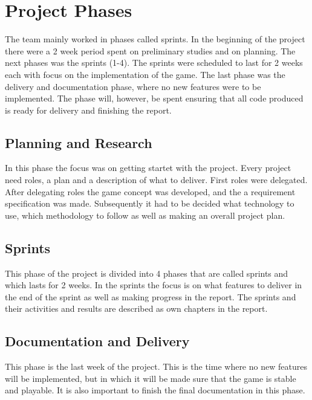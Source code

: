 \clearpage
\section{Project Phases}

The team mainly worked in phases called sprints. In the beginning of the project there were a 2 week period spent on preliminary studies and on planning. The next phases was the sprints (1-4). The sprints were scheduled to last for 2 weeks each with focus on the implementation of the game. The last phase was the delivery and documentation phase, where no new features were to be implemented. The phase will, however, be spent ensuring that all code produced is ready for delivery and finishing the report.

\subsection{Planning and Research}
In this phase the focus was on getting startet with the project. Every project need roles, a plan and a description of what to deliver. First roles were delegated. After delegating roles the game concept was developed, and the a requirement specification was made. Subsequently it had to be decided what technology to use, which methodology to follow as well as making an overall project plan. 

\subsection{Sprints}
This phase of the project is divided into 4 phases that are called sprints and which lasts for 2 weeks. In the sprints the focus is on what features to deliver in the end of the sprint as well as making progress in the report. The sprints and their activities and results are described as own chapters in the report.

\subsection{Documentation and Delivery}
This phase is the last week of the project. This is the time where no new features will be implemented, but in which it will be made sure that the game is stable and playable. It is also important to finish the final documentation in this phase.
